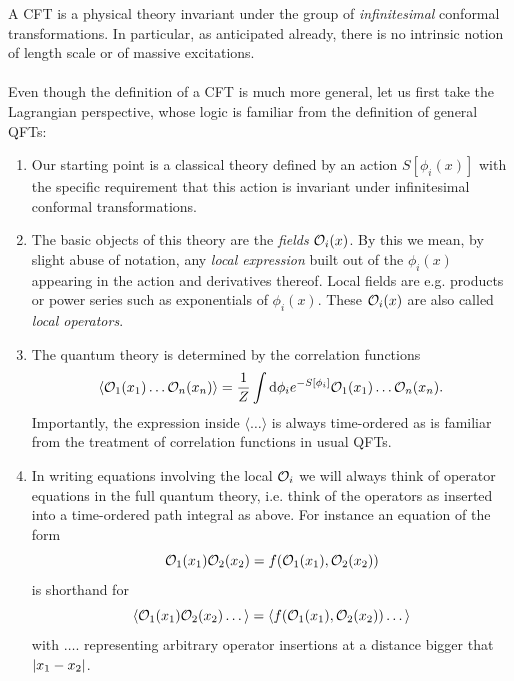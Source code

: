 A CFT is a physical theory invariant under the group of \emph{infinitesimal} conformal transformations.
In particular, as anticipated already, there is no intrinsic notion of length scale or of massive excitations.\\
\\
Even though the definition of a CFT is much more general, let us first take the Lagrangian
perspective, whose logic is familiar from the definition of general QFTs:
\begin{enumerate} 
	\item  Our starting point is a classical theory defined by an action $S[\phi_i(x)]$ with the specific
	requirement that this action is invariant under infinitesimal conformal transformations.
	\item  The basic objects of this theory are the \emph{fields} $\mathcal{O}_i(x)$. By this we mean, by slight abuse of
	notation, any \emph{local expression} built out of the $\phi_i(x)$  appearing in the action and derivatives
	thereof. Local fields are e.g. products or power series such as exponentials of $\phi_i(x)$. These $\mathcal{O}_i(x)$ are also called \emph{ local operators}.
	\item  The quantum theory is determined by the correlation functions
	\begin{equation}
	\langle \mathcal{O}_1(x_1) \dots \mathcal{O}_n(x_n) \rangle = \frac{1}{Z} \int \mathrm{d} \phi_i e^{- S[\phi_i]} \mathcal{O}_1(x_1) \dots \mathcal{O}_n(x_n).
	\end{equation}
	Importantly, the expression inside $\langle \dots \rangle$ is always time-ordered as is familiar from the treatment of correlation functions in usual QFTs.
	\item  In writing equations involving the local $\mathcal{O}_i$ we will always think of operator equations in
	the full quantum theory, i.e. think of the operators as inserted into a time-ordered path
	integral as above. For instance an equation of the form
	\begin{equation}
	\mathcal{O}_1(x_1) \mathcal{O}_2(x_2) = f(\mathcal{O}_1(x_1),\mathcal{O}_2(x_2)) 
	\end{equation}
	is shorthand for
	\begin{equation}
	\label{eq:ct1}
	\langle \mathcal{O}_1(x_1) \mathcal{O}_2(x_2) \dots \rangle = \langle f(\mathcal{O}_1(x_1),\mathcal{O}_2(x_2))\dots \rangle
	\end{equation}
	with $\dots$. representing arbitrary operator insertions at a distance bigger that $\abs{x_1-x_2}$.
	
\end{enumerate}

